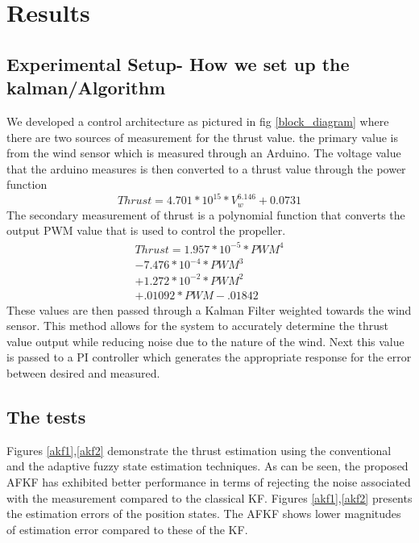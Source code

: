 \documentclass[conference]{IEEEtran}
\begin{document}
\section{Results}
\subsection{Experimental Setup- How we set up the kalman/Algorithm}

We developed a control architecture as pictured in fig \ref{block_diagram} where there are two sources of measurement for the thrust value. the primary value is from the wind sensor which is measured through an Arduino. The voltage value that the arduino measures is then converted to a thrust value through the power function
\begin{equation}
Thrust = 4.701 * 10^{15} * V_w^{6.146} + 0.0731
\label{wind_power}
\end{equation}
The secondary measurement of thrust is a polynomial function that converts the output PWM value that is used to control the propeller. \newline
\begin{eqnarray}
Thrust = 1.957*10^{-5}*PWM^4 \\
- 7.476*10^{-4}*PWM^3 \nonumber\\ 
+ 1.272*10^{-2}*PWM^2 \nonumber\\
+ .01092*PWM - .01842 \nonumber
\label{pwm_poly}
\end{eqnarray}
These values are then passed through a Kalman Filter weighted towards the wind sensor. This method allows for the system to accurately determine the thrust value output while reducing noise due to the nature of the wind. Next this value is passed to a PI controller which generates the appropriate response for the error between desired and measured. 
\subsection{The tests}
Figures \ref{akf1},\ref{akf2} demonstrate the thrust estimation using the conventional and the adaptive fuzzy state estimation techniques. As can be seen, the proposed AFKF has exhibited better performance in terms of rejecting the noise associated with the measurement compared to the classical KF. Figures \ref{akf1},\ref{akf2} presents the estimation errors of the position states. The AFKF shows lower magnitudes of estimation error compared to these of the KF. 
\end{document}

